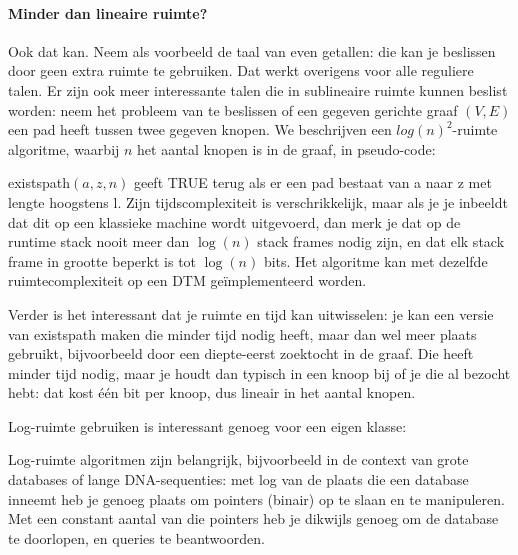 \paragraph{Minder dan lineaire ruimte?} Ook dat kan. Neem als
voorbeeld de taal van even getallen: die kan je beslissen door geen
extra ruimte te gebruiken. Dat werkt overigens voor alle reguliere
talen. Er zijn ook meer interessante talen die in sublineaire ruimte kunnen
beslist worden: neem het probleem van te beslissen of een gegeven
gerichte graaf $(V,E)$ een pad heeft tussen twee gegeven knopen. We
beschrijven een $log(n)^2$-ruimte algoritme, waarbij $n$ het aantal
knopen is in de graaf, in pseudo-code:

\begin{algorithmic}
\EndIf
{}
\EndIf


   \EndIf
\EndFor
{}
\EndFunction
\end{algorithmic}

{\sc existspath}$(a,z,n)$ geeft TRUE terug als er een pad bestaat van a naar
z met lengte hoogstens l. Zijn tijdscomplexiteit is verschrikkelijk,
maar als je je inbeeldt dat dit op een klassieke machine wordt
uitgevoerd, dan merk je dat op de runtime stack nooit meer dan
$\log(n)$ stack frames nodig zijn, en dat elk stack frame in grootte
beperkt is tot $\log(n)$ bits. Het algoritme kan met dezelfde
ruimtecomplexiteit op een DTM ge\"implementeerd worden.

Verder is het interessant dat je ruimte en tijd kan uitwisselen: je
kan een versie van \mbox{{\sc existspath}} maken die minder tijd nodig heeft, maar
dan wel meer plaats gebruikt, bijvoorbeeld door een diepte-eerst
zoektocht in de graaf. Die heeft minder tijd nodig, maar je houdt dan
typisch in een knoop bij of je die al bezocht hebt: dat kost
\'{e}\'{e}n bit per knoop, dus lineair in het aantal knopen.

Log-ruimte gebruiken is interessant genoeg voor een eigen klasse:


Log-ruimte algoritmen zijn belangrijk, bijvoorbeeld in de context van
grote databases of lange DNA-sequenties: met log van de plaats die een
database inneemt heb je genoeg plaats om pointers (binair) op te slaan
en te manipuleren. Met een constant aantal van die pointers heb je
dikwijls genoeg om de database te doorlopen, en queries te beantwoorden.

